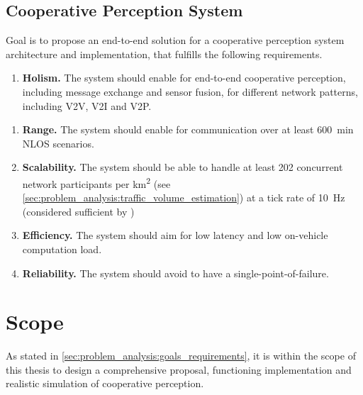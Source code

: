 \subsection{Cooperative Perception System}
\label{subsec:problem_analysis:cooperative_perception_system}

Goal is to propose an end-to-end solution for a cooperative perception system architecture and implementation, that fulfills the following requirements. 

\begin{enumerate}[F-C1:\ \ ]
	\item \textbf{Holism.} The system should enable for end-to-end cooperative perception, including message exchange and sensor fusion, for different network patterns, including V2V, V2I and V2P.
	\end{enumerate}
\begin{enumerate}[NF-C1:]
	\item \textbf{Range.} The system should enable for communication over at least \SI{600}{\meter}in NLOS scenarios.
	\item \textbf{Scalability.} The system should be able to handle at least 202 concurrent network participants per \si{\square\kilo\meter} (see \cref{sec:problem_analysis:traffic_volume_estimation}) at a tick rate of \SI{10}{\hertz} (considered sufficient by \cite{Rauch2011, Thandavarayan2019})
	\item \textbf{Efficiency.} The system should aim for low latency and low on-vehicle computation load.
	\item \textbf{Reliability.} The system should avoid to have a single-point-of-failure. 
\end{enumerate}

\section{Scope}
\label{sec:problem_analysis:scope}
As stated in \cref{sec:problem_analysis:goals_requirements}, it is within the scope of this thesis to design a comprehensive proposal, functioning implementation and realistic simulation of cooperative perception.

